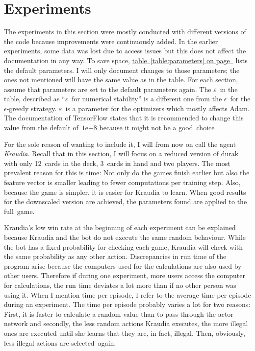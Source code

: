 \documentclass[a4paper,titlepage]{article}
\newcommand{\expn}[2]{{#1}\mathrm{e}{#2}}
\begin{document}
\newpage

\section{Experiments}

The experiments in this section were mostly conducted with different versions of the code because improvements were continuously added. In the earlier experiments, some data was lost due to access issues but this does not affect the documentation in any way.
To save space, \hyperref[table:parameters]{table~\ref*{table:parameters} on page~\pageref*{table:parameters}} lists the default parameters.
I will only document changes to those parameters; the ones not mentioned will have the same value as in the table. For each section, assume that parameters are set to the default parameters again. The $\varepsilon$~in the table, described as ``$\varepsilon$~for numerical stability'' is a different one from the $\epsilon$~for the $\epsilon$-greedy strategy. $\varepsilon$~is a parameter for the optimizers which mostly affects Adam. The documentation of TensorFlow states that it is recommended to change this value from the default of~$\expn{1}{-8}$ because it might not be a good~choice~\cite{tfadam}.

For the sole reason of wanting to include it, I will from now on call the agent \emph{Kraudia}.
Recall that in this section, I will focus on a reduced version of durak with only 12~cards in the deck, 3~cards in hand and two players. The most prevalent reason for this is time: Not only do the games finish earlier but also the feature vector is smaller leading to fewer computations per training step.
Also, because the game is simpler, it is easier for Kraudia to learn. When good results for the downscaled version are achieved, the parameters found are applied to the full~game.

Kraudia's low win rate at the beginning of each experiment can be explained because Kraudia and the bot do not execute the same random behaviour. While the bot has a fixed probability for checking each game, Kraudia will check with the same probability as any other action. Discrepancies in run time of the program arise because the computers used for the calculations are also used by other users. Therefore if during one experiment, more users access the computer for calculations, the run time deviates a lot more than if no other person was using it. When I mention time per episode, I refer to the average time per episode during an experiment. The time per episode probably varies a lot for two reasons: First, it is faster to calculate a random value than to pass through the actor network and secondly, the less random actions Kraudia executes, the more illegal ones are executed until she learns that they are, in fact, illegal. Then, obviously, less illegal actions are selected~again.
\end{document}
